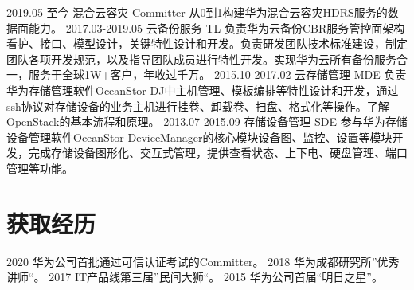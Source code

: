\documentclass[]{resume}
\begin{document}
\begin{twenty}
  \twentyitem
    {2019.05-至今}
    {混合云容灾}
    {Committer}
    {从0到1构建华为混合云容灾HDRS服务的数据面能力。}
  \twentyitem
    {2017.03-2019.05}
    {云备份服务}
    {TL}
    {负责华为云备份CBR服务管控面架构看护、接口、模型设计，关键特性设计和开发。负责研发团队技术标准建设，制定团队各项开发规范，以及指导团队成员进行特性开发。实现华为云所有备份服务合一，服务于全球1W+客户，年收过千万。}
\twentyitem
    {2015.10-2017.02}
    {云存储管理}
    {MDE}
    {负责华为存储管理软件OceanStor DJ中主机管理、模板编排等特性设计和开发，通过ssh协议对存储设备的业务主机进行挂卷、卸载卷、扫盘、格式化等操作。了解OpenStack的基本流程和原理。}
\twentyitem
    {2013.07-2015.09}
    {存储设备管理}
    {SDE}
    {参与华为存储设备管理软件OceanStor DeviceManager的核心模块设备图、监控、设置等模块开发，完成存储设备图形化、交互式管理，提供查看状态、上下电、硬盘管理、端口管理等功能。}
\end{twenty}

\section{获取经历}

\begin{twentyshort}
  \twentyitemshort
    {2020}
    {华为公司首批通过可信认证考试的Committer。}
  \twentyitemshort
    {2018}
    {华为成都研究所”优秀讲师“。}
  \twentyitemshort
    {2017}
    {IT产品线第三届”民间大狮“。}
  \twentyitemshort
    {2015}
    {华为公司首届“明日之星”}。
\end{twentyshort}

\end{document}
